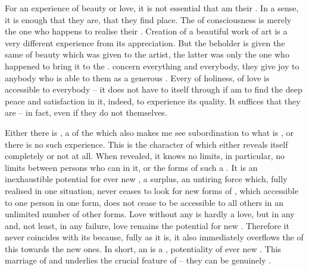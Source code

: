 For an experience of beauty or love, it is not essential that  am their
.  In a sense, it is enough that they are, that they find place.
The  of  consciousness is merely the one who happens
to realise their . Creation of a beautiful work of art is a
very different experience from its appreciation. But the beholder is given the
same  of beauty which was given to the artist, the latter was only the
one who  happened to bring it to the .
 concern everything and everybody, they give joy to anybody
who is able to  them as a generous .   Every  of
holiness, of love is accessible to everybody -- it does not have to
 itself through  if  am to find the deep peace and
satisfaction in it, indeed, to experience its quality.  It suffices that they
are -- in fact, even if they do not  themselves.


\pa\label{pa:shareable}
Either there is , a  of the 
which also makes me see  subordination to what is , or there
is no such experience.  This is the character of  which either
reveals itself completely or not at all. When revealed, it knows no limits, in
particular, no limits between persons who can  in it, or the
forms of such a .  It is an inexhaustible potential for ever
new , a surplus, an untiring force which, fully realised in
one situation, never ceases to look for new forms of , which
accessible to one person in one form, does not cease to be accessible to all
others in an unlimited number of other forms.
Love without any  is hardly a love, but
in any  and, not least, in any failure, love remains the
potential for new .  Therefore it never coincides with its
 because, fully  as it is, it also immediately overflows
the  of this  towards the new ones.  In short, an
 is a , potentiality of ever new
. This marriage of  and 
underlies the crucial feature of  -- they can be genuinely
. 

